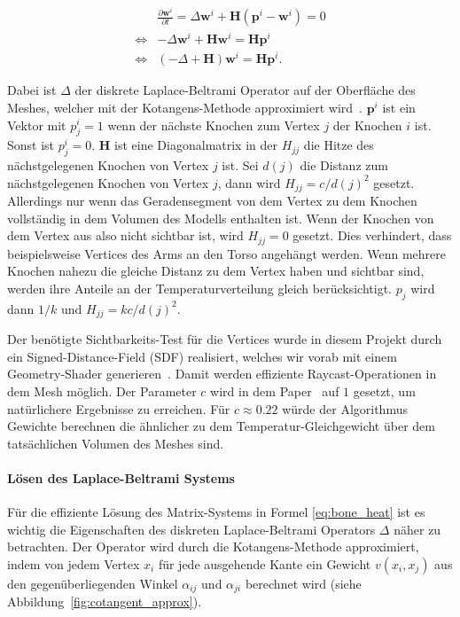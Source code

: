 \begin{equation}
	\label{eq:bone_heat}
	\begin{aligned}
		     & \frac{\partial\mathbf{w}^i}{\partial t} = \Delta\mathbf{w}^i+\mathbf{H}\left(\mathbf{p}^i-\mathbf{w}^i\right)=0 \\
		\iff & -\Delta\mathbf{w}^i+\mathbf{H}\mathbf{w}^i=\mathbf{H}\mathbf{p}^i                                               \\
		\iff & \left(-\Delta+\mathbf{H}\right)\mathbf{w}^i=\mathbf{H}\mathbf{p}^i.
	\end{aligned}
\end{equation}

Dabei ist $\Delta$ der diskrete Laplace-Beltrami Operator auf der Oberfläche des Meshes, welcher mit der Kotangens-Methode approximiert wird~\cite{laplace_beltrami_paper}. $\mathbf{p}^i$ ist ein Vektor mit $p^i_j=1$ wenn der nächste Knochen zum Vertex $j$ der Knochen $i$ ist. Sonst ist $p^i_j=0$. $\mathbf{H}$ ist eine Diagonalmatrix in der $H_{jj}$ die Hitze des nächstgelegenen Knochen von Vertex $j$ ist. Sei $d(j)$ die Distanz zum nächstgelegenen  Knochen von Vertex $j$, dann wird $H_{jj}=c/d(j)^2$ gesetzt. Allerdings nur wenn das Geradensegment von dem Vertex zu dem Knochen vollständig in dem Volumen des Modells enthalten ist. Wenn der Knochen von dem Vertex aus also nicht sichtbar ist, wird $H_{jj}=0$ gesetzt. Dies verhindert, dass beispielsweise Vertices des Arms an den Torso angehängt werden. Wenn mehrere Knochen nahezu die gleiche Distanz zu dem Vertex haben und sichtbar sind, werden ihre Anteile an der Temperaturverteilung gleich berücksichtigt. $p_j$ wird dann $1/k$ und $H_{jj} = kc/d(j)^2$.

Der benötigte Sichtbarkeits-Test für die Vertices wurde in diesem Projekt durch ein Signed-Distance-Field (SDF) realisiert, welches wir vorab mit einem Geometry-Shader generieren~\cite{signed_distance_field}. Damit werden effiziente Raycast-Operationen in dem Mesh möglich.
Der Parameter $c$ wird in dem Paper~\cite{bone_heat_paper} auf $1$ gesetzt, um natürlichere Ergebnisse zu erreichen. Für $c\approx0.22$ würde der Algorithmus Gewichte berechnen die ähnlicher zu dem Temperatur-Gleichgewicht über dem tatsächlichen Volumen des Meshes sind.

\paragraph{Lösen des Laplace-Beltrami Systems}
Für die effiziente Lösung des Matrix-Systems in Formel \ref{eq:bone_heat} ist es wichtig die Eigenschaften des diskreten Laplace-Beltrami Operators $\Delta$ näher zu betrachten. Der Operator wird durch die Kotangens-Methode approximiert, indem von jedem Vertex $x_i$ für jede ausgehende Kante ein Gewicht $v(x_i,x_j)$ aus den gegenüberliegenden Winkel $\alpha_{ij}$ und $\alpha_{ji}$ berechnet wird (siehe Abbildung~\ref{fig:cotangent_approx}).

